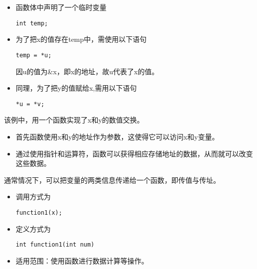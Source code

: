 \begin{frame}[fragile]
\begin{itemize}
\item
函数体中声明了一个临时变量
\begin{lstlisting}[backgroundcolor=\color{blue!10}]
int temp;
\end{lstlisting}
\item
为了把{\tf x}的值存在{\tf temp}中，需使用以下语句
\begin{lstlisting}[backgroundcolor=\color{blue!10}]
temp = *u; 
\end{lstlisting}
因{\tf u}的值为{\tf \&x}，即{\tf x}的地址，故{\tf *u}代表了{\tf x}的值。\\[0.1in]
\item 
同理，为了把{\tf y}的值赋给{\tf x},需用以下语句
\begin{lstlisting}[backgroundcolor=\color{blue!10}]
*u = *v;
\end{lstlisting}
\end{itemize}
\end{frame}

\begin{frame}[fragile]
该例中，用一个函数实现了{\tf x}和{\tf y}的数值交换。\vspace{0.1in}

\begin{itemize}
\item
首先函数使用{\tf x}和{\tf y}的地址作为参数，这使得它可以访问{\tf x}和{\tf y}变量。\\[0.1in]
\item 
通过使用指针和运算符{\tf *}，函数可以获得相应存储地址的数据，从而就可以改变这些数据。
\end{itemize}
\end{frame}

\begin{frame}[fragile]
通常情况下，可以把变量的两类信息传递给一个函数，即传值与传址。
\end{frame}

\begin{frame}[fragile]
\begin{itemize}
\item 调用方式为
\begin{lstlisting}[backgroundcolor=\color{blue!10}]
function1(x);
\end{lstlisting}
\item 定义方式为
\begin{lstlisting}[backgroundcolor=\color{blue!10}]
int function1(int num)
\end{lstlisting}
\item 适用范围：使用函数进行数据计算等操作。
\end{itemize}

\end{frame}

